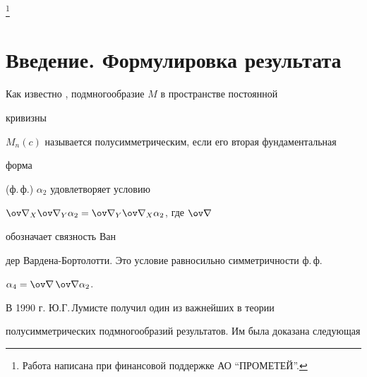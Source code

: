   


\thanks{Работа написана при финансовой поддержке АО ``ПРОМЕТЕЙ''.}  


\date{}  




  


\pagestyle{plain} %


  


  




  


\maketitle  


  




  


\section{Введение. Формулировка результата}  


 


Как известно \cite{Lum1}, подмногообразие $M$ в пространстве постоянной 


кривизны 


$M_n(c)$ называется полусимметрическим, если его вторая фундаментальная 


форма 


(ф.\,ф.) $\alpha_2$ удовлетворяет условию 


$\ov\na_X\ov\na_Y\alpha_2=\ov\na_Y\ov\na_X\alpha_2$, где $\ov\na$ 


обозначает связность Ван 


дер Вардена-Бортолотти. Это условие равносильно симметричности ф.\,ф. 


$\alpha_4=\ov\na{\,}\ov\na\alpha_2$. 


 


В 1990 г. Ю.Г.\,Лумисте получил один из важнейших в теории 


полусимметрических подмногообразий результатов. Им была доказана следующая 


